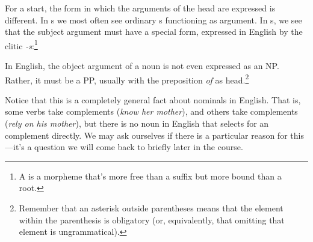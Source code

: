 \documentclass{article}
\begin{document}
For a start, the form in which the arguments of the head are expressed is different.
In s we most often see ordinary s functioning as argument.
In s, we see that the subject argument must have a special  form, expressed in English by the clitic \emph{-s}:\footnote{A  is a morpheme that's more free than a suffix but more bound than a root.}
\begin{exe}
\end{exe}
In English, the object argument of a noun is not even expressed as an NP.
Rather, it must be a PP, usually with the preposition \emph{of} as head.\footnote{Remember that an asterisk outside parentheses means that the element within the parenthesis is obligatory (or, equivalently, that omitting that element is ungrammatical).}
\begin{exe}
\end{exe}
Notice that this is a completely general fact about nominals in English.
That is, some verbs take  complements (\emph{know her mother}), and others take  complements (\emph{rely on his mother}), but there is no noun in English that selects for an  complement directly.
We may ask ourselves if there is a particular reason for this---it's a question we will come back to briefly later in the course.
\end{document}
